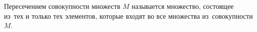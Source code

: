 
     Пересечением совокупности множеств $M$ называется множество, состоящее из~тех и только
      тех элементов, которые входят во все множества из~совокупности $M$.
